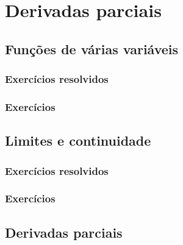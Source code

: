 
\chapter{Derivadas parciais}\label{chap:parciais}
\emconstrucao


\section{Funções de várias variáveis}

\subsection*{Exercícios resolvidos}
\construirExeresol

\subsection*{Exercícios}
\construirExer


\section{Limites e continuidade}

\subsection*{Exercícios resolvidos}
\construirExeresol

\subsection*{Exercícios}
\construirExer

\section{Derivadas parciais}

